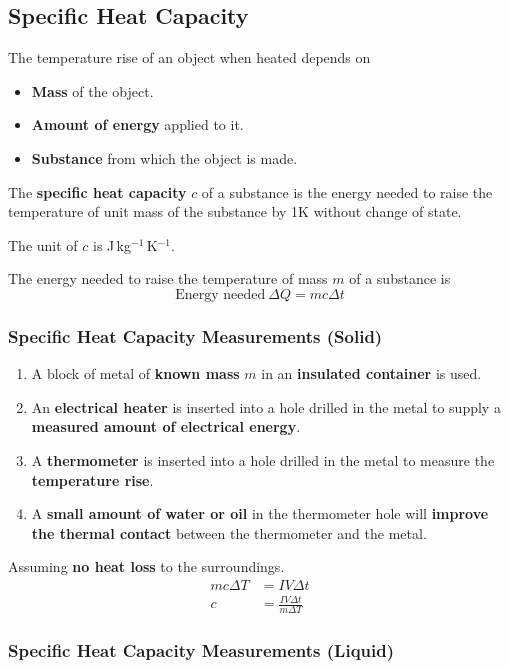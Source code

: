 \subsection{Specific Heat Capacity}

The temperature rise of an object when heated depends on
\begin{itemize}
    \item \textbf{Mass} of the object.
    \item \textbf{Amount of energy} applied to it.
    \item \textbf{Substance} from which the object is made.
\end{itemize}

The \textbf{specific heat capacity} $c$ of a substance is the energy needed to raise the temperature of unit mass of the substance by 1K without change of state.

The unit of $c$ is J\,kg$^{-1}$\,K$^{-1}$.

The energy needed to raise the temperature of mass $m$ of a substance is
$$\text{Energy needed}\ \Delta Q=mc\Delta t$$

\subsubsection*{Specific Heat Capacity Measurements (Solid)}

\begin{enumerate}
    \item A block of metal of \textbf{known mass} $m$ in an \textbf{insulated container} is used.
    \item An \textbf{electrical heater} is inserted into a hole drilled in the metal to supply a \textbf{measured amount of electrical energy}.
    \item A \textbf{thermometer} is inserted into a hole drilled in the metal to measure the \textbf{temperature rise}.
    \item A \textbf{small amount of water or oil} in the thermometer hole will \textbf{improve the thermal contact} between the thermometer and the metal.
\end{enumerate}

Assuming \textbf{no heat loss} to the surroundings.
\begin{align*}
    mc\Delta T&=IV\Delta t\\
    c&=\frac{IV\Delta t}{m\Delta T}
\end{align*}

\subsubsection*{Specific Heat Capacity Measurements (Liquid)}

